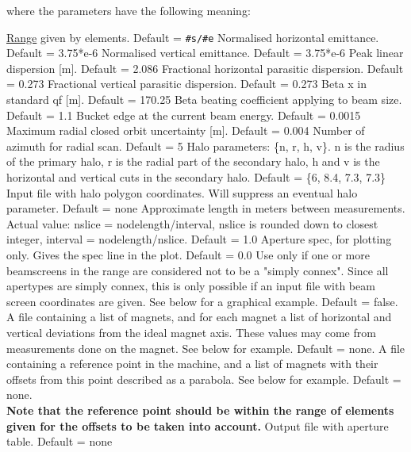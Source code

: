 where the parameters have the following meaning: 
\begin{5.02.04}
\begin{madlist}
    \hyperref[sec:range]{Range} given by
     elements. Default = {\tt \#s/\#e}  
    Normalised horizontal emittance. Default = 3.75*e-6  
    Normalised vertical emittance. Default = 3.75*e-6 
    Peak linear dispersion [m]. Default = 2.086 
    Fractional horizontal parasitic dispersion. Default = 0.273 
    Fractional vertical parasitic dispersion. Default = 0.273 
    Beta x in standard qf [m]. Default = 170.25 
    Beta beating coefficient applying to beam size. Default = 1.1 
    Bucket edge at the current beam energy. Default = 0.0015 
    Maximum radial closed orbit uncertainty [m]. Default = 0.004 
    Number of azimuth for radial scan. Default = 5 
    Halo parameters: \{n, r, h, v\}. n is the radius of the
     primary halo,  r is the radial part of the secondary halo, h and v
     is the horizontal and  vertical cuts in the secondary halo. Default
     = \{6, 8.4, 7.3, 7.3\}  
    Input file with halo polygon coordinates. Will
     suppress  an eventual halo parameter. Default = none  
    Approximate length in meters between
     measurements. Actual value:  nslice = nodelength/interval, nslice
     is rounded down to closest integer,  interval =
     nodelength/nslice. Default = 1.0  
    Aperture spec, for plotting only. Gives the spec line in
     the plot. Default = 0.0  
    Use only if one or more beamscreens in the range are
     considered not to  be a "simply connex". Since all \madx apertypes
     are simply connex, this is only possible  if an input file with
     beam screen coordinates are given. See below for a graphical
     example. Default = false.  
    A file containing a list of magnets, and for each
     magnet a list of horizontal and vertical deviations from the ideal
     magnet axis. These values may come from measurements done on the
     magnet. See below for example. Default = none.  
    A file containing a reference point in the machine,
     and a list of magnets with their offsets from this point described
     as a parabola. See below for example. Default = none. \\
     {\bf Note that the reference point should be within the range of
       elements given for the offsets to be taken into account.}
    Output file with aperture table. Default = none 
\end{madlist}
\end{5.02.04}

